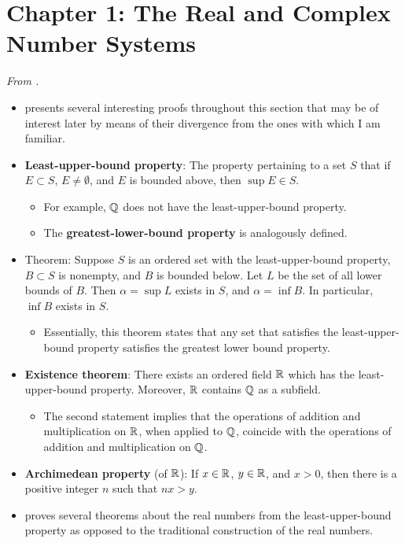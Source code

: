 \documentclass[../../notes.tex]{subfiles}
\begin{document}
\section{Chapter 1: The Real and Complex Number Systems}
\emph{From \textcite{bib:Rudin}.}
\begin{itemize}
    \item {}\textcite{bib:Rudin} presents several interesting proofs throughout this section that may be of interest later by means of their divergence from the ones with which I am familiar.
    \item \textbf{Least-upper-bound property}: The property pertaining to a set $S$ that if $E\subset S$, $E\neq\emptyset$, and $E$ is bounded above, then $\sup E\in S$.
    \begin{itemize}
        \item For example, $\mathbb{Q}$ does not have the least-upper-bound property.
        \item The \textbf{greatest-lower-bound property} is analogously defined.
    \end{itemize}
    \item Theorem: Suppose $S$ is an ordered set with the least-upper-bound property, $B\subset S$ is nonempty, and $B$ is bounded below. Let $L$ be the set of all lower bounds of $B$. Then $\alpha=\sup L$ exists in $S$, and $\alpha=\inf B$. In particular, $\inf B$ exists in $S$.
    \begin{itemize}
        \item Essentially, this theorem states that any set that satisfies the least-upper-bound property satisfies the greatest lower bound property.
    \end{itemize}
    \item \textbf{Existence theorem}: There exists an ordered field $\mathbb{R}$ which has the least-upper-bound property. Moreover, $\mathbb{R}$ contains $\mathbb{Q}$ as a subfield.
    \begin{itemize}
        \item The second statement implies that the operations of addition and multiplication on $\mathbb{R}$, when applied to $\mathbb{Q}$, coincide with the operations of addition and multiplication on $\mathbb{Q}$.
    \end{itemize}
    \item \textbf{Archimedean property} (of $\mathbb{R}$): If $x\in\mathbb{R}$, $y\in\mathbb{R}$, and $x>0$, then there is a positive integer $n$ such that $nx>y$.
    \item \textcite{bib:Rudin} proves several theorems about the real numbers from the least-upper-bound property as opposed to the traditional construction of the real numbers.

\end{itemize}
\end{document}

